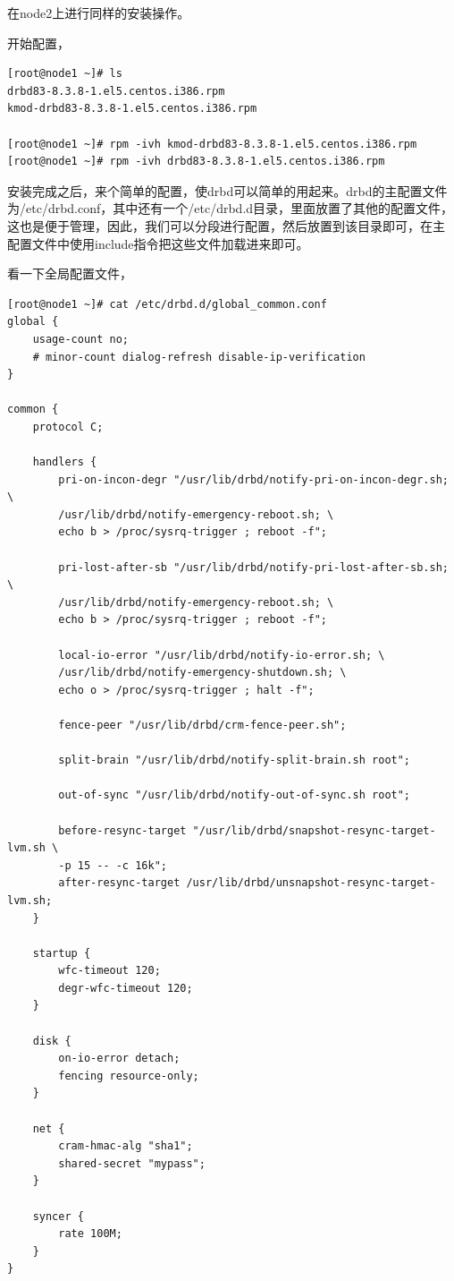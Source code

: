 在node2上进行同样的安装操作。

开始配置，

\small{
\begin{verbatim}
[root@node1 ~]# ls
drbd83-8.3.8-1.el5.centos.i386.rpm
kmod-drbd83-8.3.8-1.el5.centos.i386.rpm

[root@node1 ~]# rpm -ivh kmod-drbd83-8.3.8-1.el5.centos.i386.rpm
[root@node1 ~]# rpm -ivh drbd83-8.3.8-1.el5.centos.i386.rpm
\end{verbatim}
}
\normalsize

安装完成之后，来个简单的配置，使drbd可以简单的用起来。drbd的主配置文件
为/etc/drbd.conf，其中还有一个/etc/drbd.d目录，里面放置了其他的配置文件，
这也是便于管理，因此，我们可以分段进行配置，然后放置到该目录即可，在主
配置文件中使用include指令把这些文件加载进来即可。

看一下全局配置文件，

\small{
\begin{verbatim}
[root@node1 ~]# cat /etc/drbd.d/global_common.conf 
global {
	usage-count no;
	# minor-count dialog-refresh disable-ip-verification
}

common {
	protocol C;

	handlers {
		pri-on-incon-degr "/usr/lib/drbd/notify-pri-on-incon-degr.sh; \
	    /usr/lib/drbd/notify-emergency-reboot.sh; \
        echo b > /proc/sysrq-trigger ; reboot -f";

		pri-lost-after-sb "/usr/lib/drbd/notify-pri-lost-after-sb.sh; \
        /usr/lib/drbd/notify-emergency-reboot.sh; \
        echo b > /proc/sysrq-trigger ; reboot -f";

		local-io-error "/usr/lib/drbd/notify-io-error.sh; \
        /usr/lib/drbd/notify-emergency-shutdown.sh; \
        echo o > /proc/sysrq-trigger ; halt -f";

		fence-peer "/usr/lib/drbd/crm-fence-peer.sh";

		split-brain "/usr/lib/drbd/notify-split-brain.sh root";

		out-of-sync "/usr/lib/drbd/notify-out-of-sync.sh root";

		before-resync-target "/usr/lib/drbd/snapshot-resync-target-lvm.sh \
        -p 15 -- -c 16k";
		after-resync-target /usr/lib/drbd/unsnapshot-resync-target-lvm.sh;
	}

	startup {
        wfc-timeout 120;
        degr-wfc-timeout 120;
	}

	disk {
        on-io-error detach;
        fencing resource-only;
	}

	net {
        cram-hmac-alg "sha1";
        shared-secret "mypass";
	}

	syncer {
        rate 100M;
	}
}
\end{verbatim}
}
\normalsize

